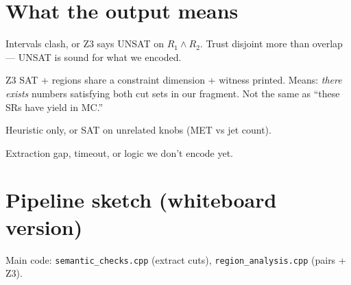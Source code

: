\documentclass[11pt,a4paper]{article}
\begin{document}
\section{What the output means}

\begin{description}[style=nextline, leftmargin=2.8cm]
  \item[PROVEN DISJOINT] Intervals clash, or Z3 says UNSAT on $R_1 \wedge R_2$.
        Trust disjoint more than overlap --- UNSAT is sound for what we encoded.
  \item[PROVEN OVERLAPPING] Z3 SAT + regions share a constraint dimension + witness printed.
        Means: \emph{there exists} numbers satisfying both cut sets in our fragment.
        Not the same as ``these SRs have yield in MC.''
  \item[POSSIBLY OVERLAPPING] Heuristic only, or SAT on unrelated knobs (MET vs jet count).
  \item[UNKNOWN] Extraction gap, timeout, or logic we don't encode yet.
\end{description}

\section{Pipeline sketch (whiteboard version)}

\begin{center}
\end{center}

Main code: \texttt{semantic\_checks.cpp} (extract cuts), \texttt{region\_analysis.cpp} (pairs + Z3).

\end{document}
